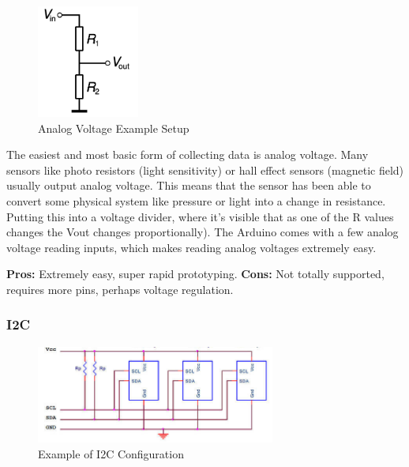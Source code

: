\documentclass[a4paper]{article}
\begin{document}
\label{fig:a_vol}
\begin{figure}
  \begin{center}
    \includegraphics[width=0.3\textwidth]{voltage_divider.png}
  \end{center}
  \caption{Analog Voltage Example Setup}
\end{figure}

The easiest and most basic form of collecting data is analog voltage. Many sensors like photo resistors (light sensitivity) or hall effect sensors (magnetic field) usually output analog voltage. This means that the sensor has been able to convert some physical system like pressure or light into a change in resistance. Putting this into a voltage divider, where it's visible that as one of the R values changes the Vout changes proportionally).  The Arduino comes with a few analog voltage reading inputs, which makes reading analog voltages extremely easy.

\newline
\noindent
\textbf{Pros:} Extremely easy, super rapid prototyping.
\newline \noindent
\textbf{Cons:} Not totally supported, requires more pins, perhaps voltage regulation.

\subsubsection{I2C}

\label{fig:spi}
\begin{figure}
  \begin{center}
    \includegraphics[width=0.7\textwidth]{I2C_bus.jpg}
  \end{center}
  \caption{Example of I2C Configuration}
\end{figure}
\end{document}
